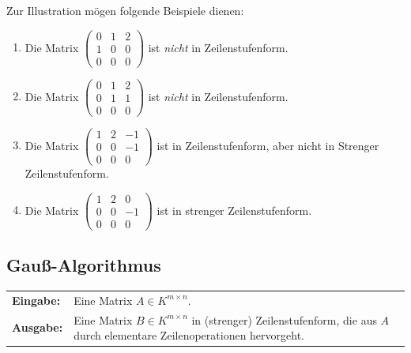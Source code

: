 \documentclass{scrartcl}
\begin{document}
\begin{Beispiel} 
Zur Illustration mögen folgende Beispiele dienen:
\begin{enumerate}[label={(\arabic*)}]
\item Die Matrix $\begin{pmatrix} 0 & 1 & 2 \\ 1 & 0 & 0 \\ 0 & 0 & 0 \end{pmatrix}$ ist \textit{nicht} in Zeilenstufenform.
\item Die Matrix $\begin{pmatrix} 0 & 1 & 2 \\ 0 & 1 & 1 \\ 0 & 0 & 0 \end{pmatrix}$ ist \textit{nicht} in Zeilenstufenform.
\item Die Matrix $\begin{pmatrix} 1 & 2 & -1 \\ 0 & 0 & -1 \\ 0 & 0 & 0 \end{pmatrix}$ ist in Zeilenstufenform, aber nicht in Strenger Zeilenstufenform.
\item Die Matrix $\begin{pmatrix} 1 & 2 & 0 \\ 0 & 0 & -1 \\ 0 & 0 & 0 \end{pmatrix}$ ist in strenger Zeilenstufenform.
\end{enumerate}
\end{Beispiel}

\subsection{Gauß-Algorithmus}
\label{Gauss}

\begin{tabular}{p{}p{}}
\textbf{Eingabe:} & Eine Matrix $A \in K^{m \times n}$. \\
\textbf{Ausgabe:} & Eine Matrix $B \in K^{m \times n}$ in (strenger) Zeilenstufenform, die aus $A$ durch elementare Zeilenoperationen hervorgeht.
\end{tabular}
\end{document}
